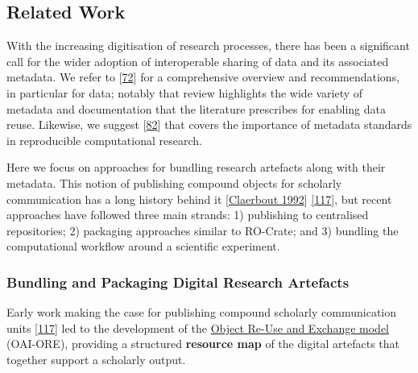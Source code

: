 \hypertarget{relatedwork}{%
\subsection{Related Work}\label{relatedwork}}

With the increasing digitisation of research processes, there has been a
significant call for the wider adoption of interoperable sharing of data
and its associated metadata. We refer to
{[}\href{https://doi.org/10.1016/j.patter.2020.100136}{72}{]} for a
comprehensive overview and recommendations, in particular for data;
notably that review highlights the wide variety of metadata and
documentation that the literature prescribes for enabling data reuse.
Likewise, we suggest
{[}\href{https://doi.org/10.1016/j.patter.2021.100322}{82}{]} that
covers the importance of metadata standards in reproducible
computational research.

Here we focus on approaches for bundling research artefacts along with
their metadata. This notion of publishing compound objects for scholarly
communication has a long history behind it
{[}\href{http://sep.stanford.edu/oldsep/matt/join/redoc/web/seg92.html}{Claerbout 1992}{]}
\href{http://icl.utk.edu/ctwatch/quarterly/articles/2007/08/interoperability-for-the-discovery-use-and-re-use-of-units-of-scholarly-communication/}{{[}117{]}},
but recent approaches have followed three main strands: 1) publishing to
centralised repositories; 2) packaging approaches similar to RO-Crate;
and 3) bundling the computational workflow around a scientific
experiment.

\hypertarget{bundling-and-packaging-digital-research-artefacts}{%
\subsubsection{Bundling and Packaging Digital Research
Artefacts}\label{bundling-and-packaging-digital-research-artefacts}}

Early work making the case for publishing compound scholarly
communication units
\href{http://icl.utk.edu/ctwatch/quarterly/articles/2007/08/interoperability-for-the-discovery-use-and-re-use-of-units-of-scholarly-communication/}{{[}117{]}}
led to the development of the
\href{http://www.openarchives.org/ore/1.0/primer}{Object Re-Use and
Exchange model} (OAI-ORE), providing a structured \textbf{resource map}
of the digital artefacts that together support a scholarly output.

